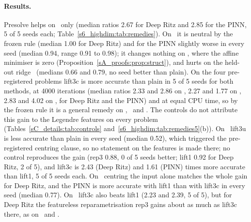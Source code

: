 \paragraph{Results.}
Presolve helps on \Pone\ only (median ratios 2.67 for Deep Ritz and 2.85 for the PINN, 5 of 5
seeds each; Table~\ref{s6_highdim:tab:remedies}). On \Ptwo\ it is neutral by the frozen rule
(median 1.00 for Deep Ritz) and for the PINN slightly worse in every seed (median 0.94, range 0.91
to 0.98); it changes nothing on \Pcospair, where the affine minimiser is zero
(Proposition~\ref{sA_proofs:prop:struct}), and hurts on the held-out ridge \Pridge\ (medians 0.66
and 0.79, no seed better than plain). On the four pre-registered problems lift3c is more accurate
than plain in 5 of 5 seeds for both methods, at 4000 iterations (median ratios 2.33 and 2.86 on
\Pone, 2.27 and 1.77 on \Pridge, 2.83 and 4.02 on \Pcospair, for Deep Ritz and the PINN) and at
equal CPU time, so by the frozen rule it is a general remedy on \Pone, \Pridge\ and \Pcospair.
The controls do not attribute this gain to the Legendre features on every problem
(Tables~\ref{sC_details:tab:controls} and~\ref{s6_highdim:tab:remedies5}(b)). On \Pone\ lift3u is
less accurate than plain in every seed (median 0.52), which triggered the pre-registered centring
clause, so no statement on the features is made there; no control reproduces the gain (rep3 0.88,
0 of 5 seeds better; lift1 0.92 for Deep Ritz, 2 of 5), and lift3c is 2.43 (Deep Ritz) and 1.61
(PINN) times more accurate than lift1, 5 of 5 seeds each. On \Pridge\ centring the input alone
matches the whole gain for Deep Ritz, and the PINN is more accurate with lift1 than with lift3c in
every seed (median 0.77). On \Pcospair\ lift3c also beats lift1 (2.23 and 2.39, 5 of 5), but for
Deep Ritz the featureless reparametrisation rep3 gains about as much as lift3c there, as on \Ptwo\
and \Pridge.
